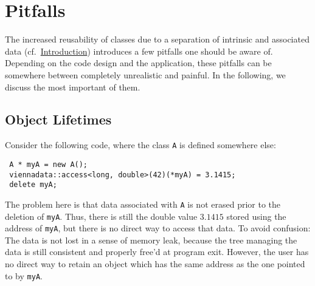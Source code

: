 \chapter{Pitfalls} \label{chap:pitfalls}
The increased reusability of classes due to a separation of intrinsic and associated data (cf.~\hyperref[intro]{Introduction})
introduces a few pitfalls one should be aware of. Depending on the code design and the application,
these pitfalls can be somewhere between completely unrealistic and painful. In the following, we discuss the most important of them.

\section{Object Lifetimes}
Consider the following code, where the class \lstinline|A| is defined somewhere else:
\begin{lstlisting}
 A * myA = new A();
 viennadata::access<long, double>(42)(*myA) = 3.1415;
 delete myA;
\end{lstlisting}
The problem here is that data associated with \lstinline|A| is not erased prior to the deletion of \lstinline|myA|.
Thus, there is still the double value $3.1415$ stored using the address of \lstinline|myA|, but there is no direct way to access that data.
To avoid confusion: The data is not lost in a sense of memory leak, because the tree managing the data is still consistent and properly free'd at program exit.
However, the user has no direct way to retain an object which has the same address as the one pointed to by \lstinline|myA|.

